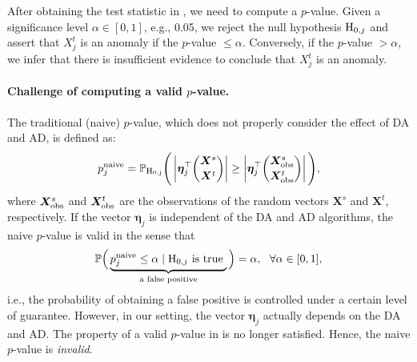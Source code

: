 After obtaining the test statistic in , we need to compute a $p$-value.
%
Given a significance level $\alpha \in [0, 1]$, e.g., 0.05, we reject the null hypothesis ${\rm H}_{0, j}$ and assert that $X_j^t$ is an anomaly if the $p$-value $ \leq \alpha$.
%
Conversely, if the $p$-value $ > \alpha$, we infer that there is insufficient evidence to conclude that $X_j^t$ is an anomaly.

\paragraph{Challenge of computing a valid $p$-value.}
The traditional (naive) $p$-value, which does not properly consider the effect of DA and AD, is defined as:
%
\begin{align*}
	p^{\rm naive}_j = 
	\mathbb{P}_{\rm H_{0, j}} 
	\Bigg ( 
		\left | \bm \eta_j^\top {\bm X^s \choose \bm X^t } \right |
		\geq 
		\left | \bm \eta_j^\top {\bm X^s_{\rm obs} \choose \bm X^t_{\rm obs} } \right |
	\Bigg ), 
\end{align*}
%
where $\bm X^s_{\rm obs}$ and $\bm X^t_{\rm obs}$ are the observations of the random vectors $\bm X^s$ and $\bm X^t$, respectively.
%
If the vector $\bm \eta_j$ is independent of the DA and AD algorithms, the naive $p$-value is valid in the sense that 
%
\begin{align} \label{eq:valid_p_value}
	\mathbb{P} \Big (
	\underbrace{p_j^{\rm naive} \leq \alpha \mid {\rm H}_{0, j} \text{ is true }}_{\text{a false positive}}
	\Big) = \alpha, ~~ \forall \alpha \in [0, 1],
\end{align} 
% 
i.e., the probability of obtaining a false positive is controlled under a certain level of guarantee.
%
However, in our setting, the vector $\bm \eta_j$ actually depends on the DA and AD.
%
The property of a valid $p$-value in  is no longer satisfied.
%
Hence, the naive $p$-value is \emph{invalid}.














 